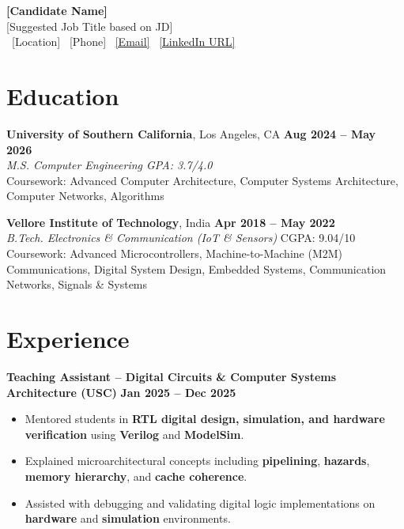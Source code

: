 \documentclass[letterpaper,11pt]{article}
\begin{document}
\begin{center}
    {\LARGE \textbf{[Candidate Name]}}\\
   {\normalsize [Suggested Job Title based on JD]}\\
\small
    \faMapMarker*\ [Location]
    \quad
    \faPhone*\ [Phone]
    \quad
    \faEnvelope\ \href{mailto:[Email]}{[Email]}
    \quad
    \faLinkedin\ \href{[LinkedIn URL]}{[LinkedIn URL]}
\end{center}
\vspace{-13pt}

\section*{Education}

\textbf{University of Southern California}, Los Angeles, CA \hfill \textbf{Aug 2024 -- May 2026} \\
\textit{M.S. Computer Engineering \hfill GPA: 3.7/4.0 }\\
Coursework: Advanced Computer Architecture, Computer Systems Architecture, Computer Networks, Algorithms

\vspace{4pt}

\textbf{Vellore Institute of Technology}, India \hfill \textbf{Apr 2018 -- May 2022} \\
\textit{B.Tech. Electronics \& Communication (IoT \& Sensors) }\hfill CGPA: 9.04/10 \\
Coursework: Advanced Microcontrollers, Machine-to-Machine (M2M) Communications, Digital System Design, Embedded Systems, Communication Networks, Signals \& Systems

\section*{Experience}

\textbf{Teaching Assistant – Digital Circuits \& Computer Systems Architecture (USC)} \hfill \textbf{Jan 2025 -- Dec 2025} \\
\begin{itemize}
\item Mentored students in \textbf{RTL digital design, simulation, and hardware verification} using \textbf{Verilog} and \textbf{ModelSim}.
\item Explained microarchitectural concepts including \textbf{pipelining}, \textbf{hazards}, \textbf{memory hierarchy}, and \textbf{cache coherence}.
\item Assisted with debugging and validating digital logic implementations on \textbf{hardware} and \textbf{simulation} environments.
\end{itemize}
\end{document}
